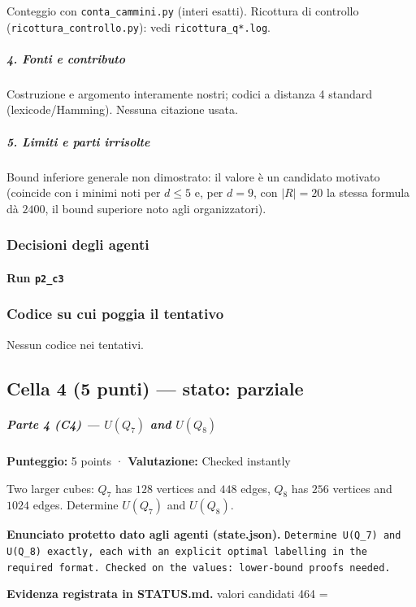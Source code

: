 \documentclass[11pt,a4paper]{article}
\begin{document}
Conteggio con \texttt{conta\_cammini.py} (interi esatti). Ricottura di
controllo (\texttt{ricottura\_controllo.py}): vedi
\texttt{ricottura\_q*.log}.

\subparagraph{4. Fonti e contributo}\label{fonti-e-contributo}

Costruzione e argomento interamente nostri; codici a distanza 4 standard
(lexicode/Hamming). Nessuna citazione usata.

\subparagraph{5. Limiti e parti
irrisolte}\label{limiti-e-parti-irrisolte}

Bound inferiore generale non dimostrato: il valore è un candidato
motivato (coincide con i minimi noti per \(d\le5\) e, per \(d=9\), con
\(|R|=20\) la stessa formula dà \(2400\), il bound superiore noto agli
organizzatori).

\subsubsection{Decisioni degli agenti}
\paragraph{Run \texttt{p2\_c3}}

\subsubsection{Codice su cui poggia il tentativo}
Nessun codice nei tentativi.

\subsection{Cella 4 (5 punti) — stato: parziale}
\subparagraph{\texorpdfstring{Parte 4 (C4) --- \(U(Q_7)\) and
\(U(Q_8)\)}{Parte 4 (C4) --- U(Q\_7) and U(Q\_8)}}\label{parte-4-c4-uq_7-and-uq_8}

\textbf{Punteggio:} 5 points · \textbf{Valutazione:} Checked instantly

Two larger cubes: \(Q_7\) has \(128\) vertices and \(448\) edges,
\(Q_8\) has \(256\) vertices and \(1024\) edges. Determine \(U(Q_7)\)
and \(U(Q_8)\).

\textbf{Enunciato protetto dato agli agenti (state.json).} \texttt{Determine U(Q\_7) and U(Q\_8) exactly, each with an explicit optimal labelling in the required format. Checked on the values: lower-bound proofs needed.}

\textbf{Evidenza registrata in STATUS.md.} valori candidati 464 =
\end{document}
